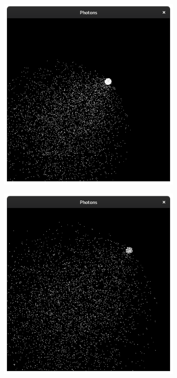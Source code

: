 \documentclass{stdlocal}
\begin{document}
\begin{figure}[p]
\begin{subfigure}[b]{0.24\textwidth}
      \end{subfigure}
      \begin{subfigure}[b]{0.24\textwidth}
        \center
        \includegraphics[width=\textwidth,trim={0 0 0 2cm},clip]{images/photons_2_06.png}
      \end{subfigure}
      \begin{subfigure}[b]{0.24\textwidth}
        \center
        \includegraphics[width=\textwidth,trim={0 0 0 2cm},clip]{images/photons_2_07.png}

\end{subfigure}
\end{figure}
\end{document}
